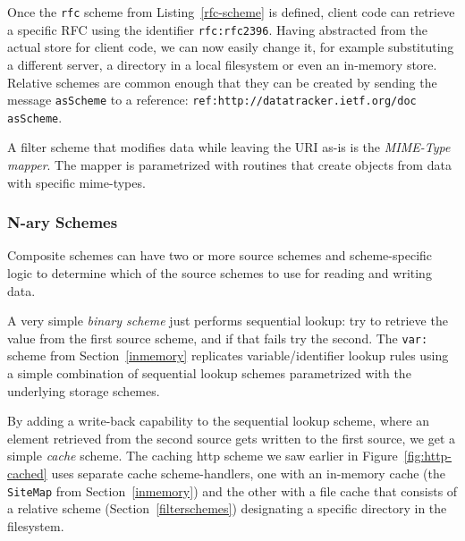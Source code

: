\documentclass[preprint]{sigplanconf}
\begin{document}
Once the {\tt rfc} scheme from Listing~\ref{rfc-scheme} is defined, client code can 
retrieve a specific RFC using the identifier {\tt  rfc:rfc2396}.  Having abstracted
from the actual store for client code, we can now easily change it, for example
substituting a different server, a directory in a local filesystem or even an 
in-memory store.  Relative schemes are common enough that they can be
created by sending the message {\tt asScheme} to a reference: {\tt ref:http://datatracker.ietf.org/doc asScheme}.




A filter scheme that modifies data while leaving the URI as-is is the \emph{MIME-Type mapper}.
The mapper is parametrized with routines that create objects from data with specific
mime-types.  


\subsubsection{N-ary Schemes}

Composite schemes can have two or more source schemes and scheme-specific logic
to determine which of the source schemes to use for reading and writing data.

A very simple \emph{binary scheme} just performs sequential lookup:  try to
retrieve the value from the first source scheme, and if that fails try the second.
The {\tt var:} scheme from Section~\ref{inmemory}  replicates variable/identifier
lookup rules using a simple combination of sequential lookup schemes parametrized
with the underlying storage schemes.

By adding a write-back capability to the sequential lookup scheme, where an element
retrieved from the second source gets written to the first source, we get a simple \emph{cache} scheme.  
The caching http scheme we saw earlier in Figure~\ref{fig:http-cached} uses
separate cache scheme-handlers, one with an in-memory cache (the {\tt SiteMap} from Section~\ref{inmemory})
and the other with a file cache that consists of a relative scheme (Section~\ref{filterschemes}) 
designating a specific directory in the filesystem.
\end{document}
